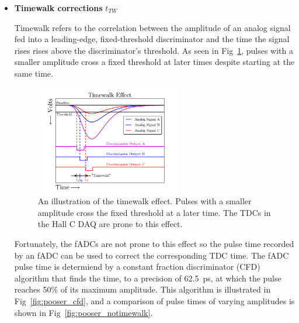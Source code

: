 \begin{itemize}
    \item \textbf{Timewalk corrections} $t_{TW}$

Timewalk refers to the correlation between
the amplitude of an analog signal fed into a leading-edge, fixed-threshold discriminator
and the time the signal rises rises above the discriminator's threshold.
As seen in Fig~\ref{fig:pooser_timewalk}, pulses with a smaller amplitude cross
a fixed threshold at later times despite starting at the same time.

\begin{figure}[!h]
    \centering
    \includegraphics[width=0.6\textwidth]{chap4/pooser_timewalk.png}
    \caption{
            An illustration of the timewalk effect.
            Pulses with a smaller amplitude cross the fixed threshold at a
            later time.
            The TDCs in the Hall C DAQ are prone to this effect.
            }
    \label{fig:pooser_timewalk}
\end{figure}

Fortunately, the fADCs are not prone to this effect so the pulse time recorded
by an fADC can be used to correct the corresponding TDC time.
The fADC pulse time is determiend by a constant fraction discriminator (CFD)
algorithm that finds the time,
to a precision of \SI{62.5}{\pico\second},
at which the pulse reaches 50\% of its maximum amplitude.
This algorithm is illustrated in Fig~\ref{fig:pooser_cfd}, and a comparison of
pulse times of varying amplitudes is shown in Fig~\ref{fig:pooser_notimewalk}.


\end{itemize}
